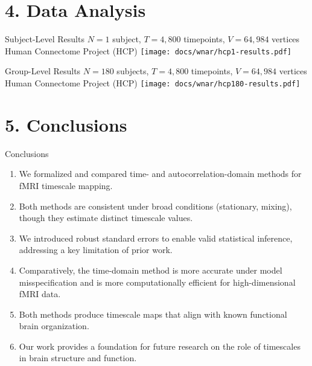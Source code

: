 \documentclass[8pt,aspectratio=169]{beamer}
\begin{document}
\section{4. Data Analysis}


\begin{frame}{Subject-Level Results}
$N = 1$ subject, \;$T = 4,800$ timepoints,\; $V = 64,984$ vertices \hfill Human Connectome Project (HCP)
\vfill
\centering
\texttt{[image: docs/wnar/hcp1-results.pdf]}
\end{frame}

\begin{frame}{Group-Level Results}
$N = 180$ subjects, \;$T = 4,800$ timepoints,\; $V = 64,984$ vertices \hfill  Human Connectome Project (HCP)
\vfill
\centering
\texttt{[image: docs/wnar/hcp180-results.pdf]}
\end{frame}

\section{5. Conclusions}

\begin{frame}{Conclusions}
\begin{enumerate}
    \item We formalized and compared time- and autocorrelation-domain methods for fMRI timescale mapping.
    \vspace{2mm}
    \item Both methods are consistent under broad conditions (stationary, mixing), though they estimate distinct timescale values.
    \vspace{2mm}
    \item We introduced robust standard errors to enable valid statistical inference, addressing a key limitation of prior work.
    \vspace{2mm}
    \item Comparatively, the time-domain method is more accurate under model misspecification and is more computationally efficient for high-dimensional fMRI data.
    \vspace{2mm}
    \item Both methods produce timescale maps that align with known functional brain organization.
    \vspace{2mm}
    \item Our work provides a foundation for future research on the role of timescales in brain structure and function.
\end{enumerate}
\end{frame}
\end{document}
